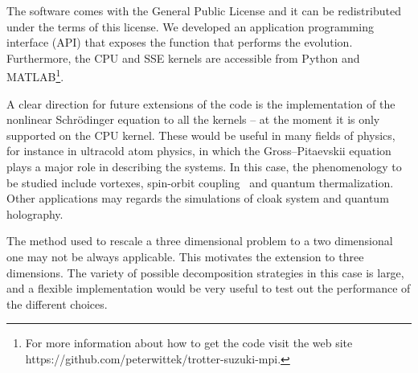 The software comes with the General Public License and it can be redistributed under the terms of this license. We developed an application programming interface (API) that exposes the function that performs the evolution. Furthermore, the CPU and SSE kernels are accessible from Python and MATLAB\footnote{For more information about how to get the code visit the web site https://github.com/peterwittek/trotter-suzuki-mpi.}.

A clear direction for future extensions of the code is the implementation of the nonlinear Schr\"odinger equation to all the kernels -- at the moment it is only supported on the CPU kernel. These would be useful in many fields of physics, for instance in ultracold atom physics, in which the Gross--Pitaevskii equation plays a major role in describing the systems. In this case, the phenomenology to be studied include vortexes, spin-orbit coupling~\citep{GS13} and quantum thermalization. Other applications may regards the simulations of cloak system and quantum holography.

The method used to rescale a three dimensional problem to  a two dimensional one may not be always applicable. This motivates the extension to three dimensions. The variety of possible decomposition strategies in this case is large, and a flexible implementation would be very useful to test out the performance of the different choices.